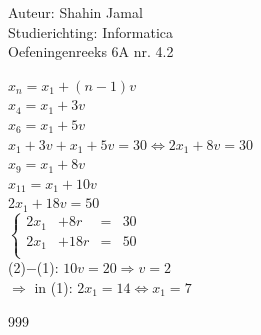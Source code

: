 \documentclass[a4paper]{article}
\begin{document}
  
\noindent \large Auteur: Shahin Jamal \\
\noindent \large Studierichting: Informatica\\
\noindent \large Oefeningenreeks 6A nr. 4.2\\

\medskip

\normalsize

$x_n = x_1 + (n-1)v$\\

$x_4 = x_1 + 3v$\\

$x_6 = x_1 + 5v$\\

$x_1+3v+x_1+5v=30 \Leftrightarrow 2x_1 + 8v = 30$\\

$x_9 = x_1 + 8v$\\

$x_11=x_1+10v$\\

$2x_1+18v=50$\\ 

$\left\{\begin{array}{rrcl}
2x_1 & + 8r & = & 30 \\
2x_1 & + 18r & = & 50 \\
\end{array}
\right.$ \\

(2)$-$(1): $10v=20\Rightarrow v = 2$\\

$\Rightarrow$ in (1): $2x_1=14 \Leftrightarrow x_1=7$\\

\begin{thebibliography}{999}
\end{thebibliography}
\end{document}
